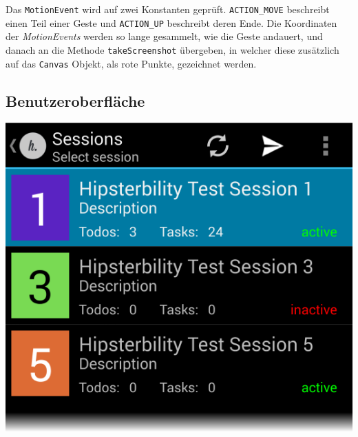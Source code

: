  Das \texttt{MotionEvent} wird auf zwei Konstanten geprüft. 
 \texttt{ACTION\_MOVE} beschreibt einen Teil einer Geste und \texttt{ACTION\_UP} beschreibt deren Ende.
 Die Koordinaten der \emph{MotionEvents} werden so lange gesammelt, wie die Geste andauert, und danach an die Methode \texttt{takeScreenshot} übergeben, in welcher diese zusätzlich auf das \texttt{Canvas} Objekt, als rote Punkte,  gezeichnet werden.



\subsection{Benutzeroberfläche}
\begin{minipage}[t]{0.45\linewidth}
	\centering
	\includegraphics[width=\linewidth]{img/screen_session_list}
	 \label{fig:screen_sessions}
\end{minipage}
\hfill
